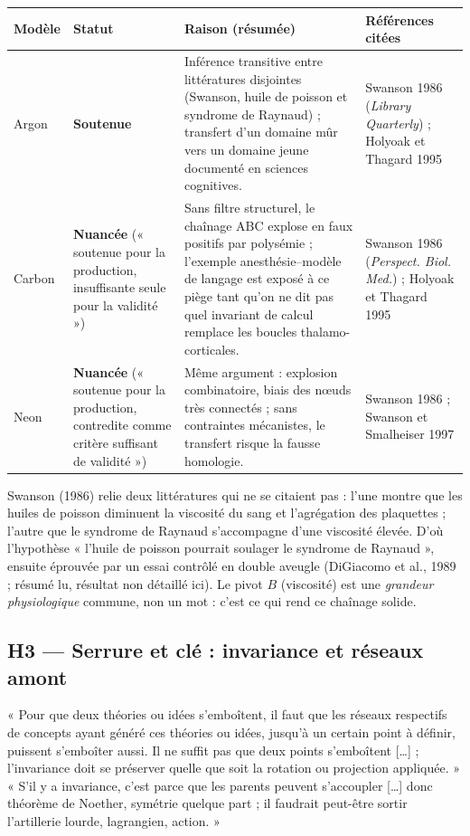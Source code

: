\documentclass[a4paper,11pt]{article}
\makeatletter
\newenvironment{avis}{\small\renewcommand{\arraystretch}{1.15}%
\begin{longtable}{@{}>{\raggedright\arraybackslash}p{1.35cm}>{\raggedright\arraybackslash}p{2.45cm}>{\raggedright\arraybackslash}p{7.15cm}>{\raggedright\arraybackslash}p{4.4cm}@{}}
\toprule \textbf{Modèle} & \textbf{Statut} & \textbf{Raison (résumée)} & \textbf{Références citées}\\ \midrule \endhead
\bottomrule \endfoot}{\end{longtable}}
\newcommand{\st}[1]{\textbf{#1}}
\makeatother
\begin{document}
\begin{avis}
Argon & \st{Soutenue} & Inférence transitive entre littératures disjointes (Swanson, huile de poisson et syndrome de Raynaud) ; transfert d'un domaine mûr vers un domaine jeune documenté en sciences cognitives. & Swanson 1986 (\emph{Library Quarterly}) ; Holyoak et Thagard 1995\\ \midrule
Carbon & \st{Nuancée} (« soutenue pour la production, insuffisante seule pour la validité ») & Sans filtre structurel, le chaînage ABC explose en faux positifs par polysémie ; l'exemple anesthésie–modèle de langage est exposé à ce piège tant qu'on ne dit pas quel invariant de calcul remplace les boucles thalamo-corticales. & Swanson 1986 (\emph{Perspect. Biol. Med.}) ; Holyoak et Thagard 1995\\ \midrule
Neon & \st{Nuancée} (« soutenue pour la production, contredite comme critère suffisant de validité ») & Même argument : explosion combinatoire, biais des nœuds très connectés ; sans contraintes mécanistes, le transfert risque la fausse homologie. & Swanson 1986 ; Swanson et Smalheiser 1997\\
\end{avis}

\begin{exemple}
Swanson (1986) relie deux littératures qui ne se citaient pas : l'une montre que les huiles de poisson diminuent la viscosité du sang et l'agrégation des plaquettes ; l'autre que le syndrome de Raynaud s'accompagne d'une viscosité élevée. D'où l'hypothèse « l'huile de poisson pourrait soulager le syndrome de Raynaud », ensuite éprouvée par un essai contrôlé en double aveugle (DiGiacomo et al., 1989 ; résumé lu, résultat non détaillé ici). Le pivot $B$ (viscosité) est une \emph{grandeur physiologique} commune, non un mot : c'est ce qui rend ce chaînage solide.
\end{exemple}

\subsection{H3 — Serrure et clé : invariance et réseaux amont}
\begin{enonce}
« Pour que deux théories ou idées s'emboîtent, il faut que les réseaux respectifs de concepts ayant généré ces théories ou idées, jusqu'à un certain point à définir, puissent s'emboîter aussi. Il ne suffit pas que deux points s'emboîtent […] ; l'invariance doit se préserver quelle que soit la rotation ou projection appliquée. » « S'il y a invariance, c'est parce que les parents peuvent s'accoupler […] donc théorème de Noether, symétrie quelque part ; il faudrait peut-être sortir l'artillerie lourde, lagrangien, action. »
\end{enonce}
\end{document}

